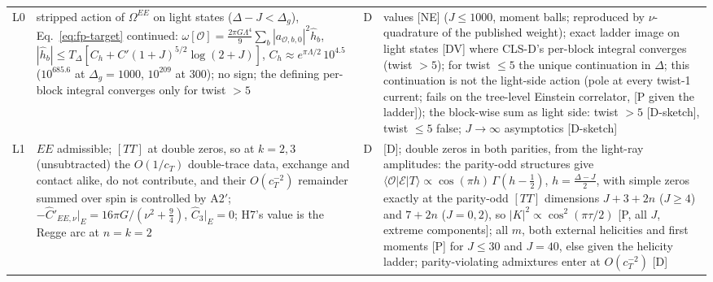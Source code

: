 \documentclass[aps,prl,onecolumn,superscriptaddress,nofootinbib]{revtex4-2}
\begin{document}
\begin{table}[!htbp]
\begin{ruledtabular}
\begin{tabular}{L{1.5cm}L{9.6cm}L{0.8cm}L{4.3cm}}
L0 & stripped action of $\Omega^{EE}$ on light states ($\Delta-J<\Delta_g$), Eq.~\eqref{eq:fp-target} continued: $\omega[\mathcal O]=\tfrac{2\pi G\Lambda^4}9\sum_b|a_{\mathcal O,b,0}|^2\hat h_b$, $|\hat h_b|\le T_\Delta[C_h+C'(1+J)^{5/2}\log(2+J)]$, $C_h\approx e^{\pi\Lambda/2}\,10^{4.5}$ ($10^{685.6}$ at $\Delta_g=1000$, $10^{209}$ at $300$); no sign; the defining per-block integral converges only for twist $>5$ & D & values [NE] ($J\le1000$, moment balls; reproduced by $\nu$-quadrature of the published weight); exact ladder image on light states [DV] where CLS-D's per-block integral converges (twist $>5$); for twist $\le5$ the unique continuation in $\Delta$; this continuation is not the light-side action (pole at every twist-1 current; fails on the tree-level Einstein correlator, [P given the ladder]); the block-wise sum as light side: twist $>5$ [D-sketch], twist $\le5$ false; $J\to\infty$ asymptotics [D-sketch]\\
L1 & $EE$ admissible; $[TT]$ at double zeros, so at $k=2,3$ (unsubtracted) the $O(1/c_T)$ double-trace data, exchange and contact alike, do not contribute, and their $O(c_T^{-2})$ remainder summed over spin is controlled by A2$'$; $-\hat C'_{EE,\nu}|_E=16\pi G/(\nu^2+\tfrac94)$, $\hat C_3|_E=0$; H7's value is the Regge arc at $n=k=2$ & D & [D]; double zeros in both parities, from the light-ray amplitudes: the parity-odd structures give
$\langle\mathcal O|\mathcal E|T\rangle\propto\cos(\pi h)\,\Gamma(h-\tfrac12)$, $h=\tfrac{\Delta-J}2$, with simple zeros exactly at the parity-odd
$[TT]$ dimensions $J+3+2n$ ($J\ge4$) and $7+2n$ ($J=0,2$), so $|K|^2\propto\cos^2(\pi\tau/2)$ [P, all $J$, extreme components]; all $m$,
both external helicities and first moments [P] for $J\le30$ and $J=40$, else given the helicity ladder; parity-violating admixtures enter
at $O(c_T^{-2})$ [D]\\
\end{tabular}
\end{ruledtabular}
\end{table}
\end{document}
